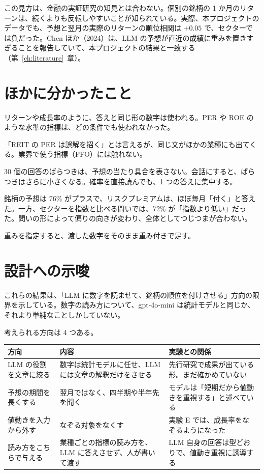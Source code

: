 \documentclass[xelatex,ja=standard,jafont=hiragino-pron,a4paper,10pt]{bxjsreport}
\newcommand{\chapref}[1]{第~\ref{#1}~章}
\begin{document}
この見方は、金融の実証研究の知見とは合わない。個別の銘柄の 1 か月のリターンは、続くよりも反転しやすいことが知られている。実際、本プロジェクトのデータでも、予想と翌月の実際のリターンの順位相関は $+0.05$ で、セクターでは負だった。Chen ほか（2024）は、LLM の予想が直近の成績に重みを置きすぎることを報告していて、本プロジェクトの結果と一致する（\chapref{ch:literature}）。

\section{ほかに分かったこと}

\begin{description}[leftmargin=2em,style=nextline,itemsep=0.4em]
\item[「率」の形をした数字だけが使われる] リターンや成長率のように、答えと同じ形の数字は使われる。PER や ROE のような水準の指標は、どの条件でも使われなかった。
\item[業種の知識は、聞けば出るが、浅い] 「REIT の PER は誤解を招く」とは言えるが、同じ文がほかの業種にも出てくる。業界で使う指標（FFO）には触れない。
\item[回答はそろいすぎる] 30 個の回答のばらつきは、予想の当たり具合を表さない。会話にすると、ばらつきはさらに小さくなる。確率を直接読んでも、1 つの答えに集中する。
\item[答えが楽観に偏る] 銘柄の予想は 76\% がプラスで、リスクプレミアムは、ほぼ毎月「付く」と答えた。一方、セクターを指数と比べる問いでは、72\% が「指数より低い」だった。問いの形によって偏りの向きが変わり、全体としてつじつまが合わない。
\item[数字を足し算に使う] 重みを指定すると、渡した数字をそのまま重み付きで足す。
\end{description}

\section{設計への示唆}

これらの結果は、「LLM に数字を読ませて、銘柄の順位を付けさせる」方向の限界を示している。数字の読み方について、gpt-4o-mini は統計モデルと同じか、それより単純なことしかしていない。

考えられる方向は 4 つある。

\begin{longtable}{p{3.80cm}p{5.20cm}p{5.40cm}}
\toprule
\textbf{方向} & \textbf{内容} & \textbf{実験との関係} \\
\midrule
\endfirsthead
\bottomrule
\endfoot
LLM の役割を文章に絞る & 数字は統計モデルに任せ、LLM には文章の解釈だけをさせる & 先行研究で成果が出ている形。まだ確かめていない \\
予想の期間を長くする & 翌月ではなく、四半期や半年先を聞く & モデルは「短期だから値動きを重視する」と述べている \\
値動きを入力から外す & なぞる対象をなくす & 実験 E では、成長率をなぞるようになった \\
読み方をこちらで与える & 業種ごとの指標の読み方を、LLM に答えさせず、人が書いて渡す & LLM 自身の回答は型どおりで、値動き重視に誘導する \\
\end{longtable}
\end{document}
